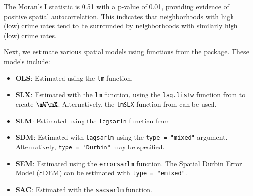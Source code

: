 \documentclass[english,12pt]{book}\usepackage[]{graphicx}\usepackage[]{xcolor}
\begin{document}
The Moran's I statistic is 0.51 with a p-value of 0.01, providing evidence of positive spatial autocorrelation. This indicates that neighborhoods with high (low) crime rates tend to be surrounded by neighborhoods with similarly high (low) crime rates. 

Next, we estimate various spatial models using functions from the  package. These models include:

\begin{itemize} 
\item \textbf{OLS}: Estimated using the \texttt{lm} function. 
\item \textbf{SLX}: Estimated with the \texttt{lm} function, using the \texttt{lag.listw} function from  to create $\mW\mX$. Alternatively, the \texttt{lmSLX} function from  can be used. \item \textbf{SLM}: Estimated using the \texttt{lagsarlm} function from . 
\item \textbf{SDM}: Estimated with \texttt{lagsarlm} using the \texttt{type = "mixed"} argument. Alternatively, \texttt{type = "Durbin"} may be specified. 
\item \textbf{SEM}: Estimated using the \texttt{errorsarlm} function. The Spatial Durbin Error Model (SDEM) can be estimated with \texttt{type = "emixed"}. 
\item \textbf{SAC}: Estimated with the \texttt{sacsarlm} function. 
\end{itemize}
\end{document}
